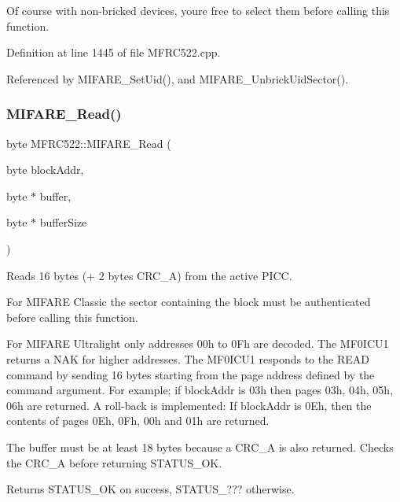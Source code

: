 Of course with non-\/bricked devices, you\textquotesingle{}re free to select them before calling this function. 

Definition at line 1445 of file M\+F\+R\+C522.\+cpp.



Referenced by M\+I\+F\+A\+R\+E\+\_\+\+Set\+Uid(), and M\+I\+F\+A\+R\+E\+\_\+\+Unbrick\+Uid\+Sector().

\mbox{\label{class_m_f_r_c522_a05cdd51aa162e37de1a9439b75901e28}} 
\subsubsection{\texorpdfstring{M\+I\+F\+A\+R\+E\+\_\+\+Read()}{MIFARE\_Read()}}
{\footnotesize\ttfamily byte M\+F\+R\+C522\+::\+M\+I\+F\+A\+R\+E\+\_\+\+Read (\begin{DoxyParamCaption}\item[{byte}]{block\+Addr,  }\item[{byte $\ast$}]{buffer,  }\item[{byte $\ast$}]{buffer\+Size }\end{DoxyParamCaption})}

Reads 16 bytes (+ 2 bytes C\+R\+C\+\_\+A) from the active P\+I\+CC.

For M\+I\+F\+A\+RE Classic the sector containing the block must be authenticated before calling this function.

For M\+I\+F\+A\+RE Ultralight only addresses 00h to 0\+Fh are decoded. The M\+F0\+I\+C\+U1 returns a N\+AK for higher addresses. The M\+F0\+I\+C\+U1 responds to the R\+E\+AD command by sending 16 bytes starting from the page address defined by the command argument. For example; if block\+Addr is 03h then pages 03h, 04h, 05h, 06h are returned. A roll-\/back is implemented\+: If block\+Addr is 0\+Eh, then the contents of pages 0\+Eh, 0\+Fh, 00h and 01h are returned.

The buffer must be at least 18 bytes because a C\+R\+C\+\_\+A is also returned. Checks the C\+R\+C\+\_\+A before returning S\+T\+A\+T\+U\+S\+\_\+\+OK.

\begin{DoxyReturn}{Returns}
S\+T\+A\+T\+U\+S\+\_\+\+OK on success, S\+T\+A\+T\+U\+S\+\_\+??? otherwise. 
\end{DoxyReturn}

